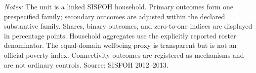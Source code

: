 \begin{minipage}{0.98\linewidth}\footnotesize\textit{Notes:} The unit is a linked SISFOH household. Primary outcomes form one prespecified family; secondary outcomes are adjusted within the declared substantive family. Shares, binary outcomes, and zero-to-one indices are displayed in percentage points. Household aggregates use the explicitly reported roster denominator. The equal-domain wellbeing proxy is transparent but is not an official poverty index. Connectivity outcomes are registered as mechanisms and are not ordinary controls. Source: SISFOH 2012--2013.\end{minipage}
\endgroup
